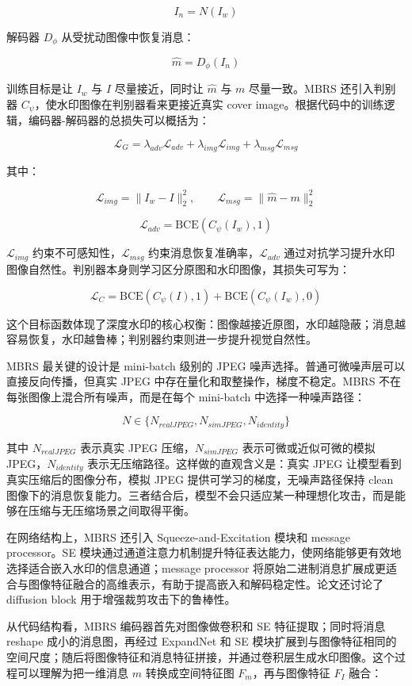﻿\documentclass[UTF8,zihao=5]{ctexart}
\begin{document}
\[
I_n = N(I_w)
\]

解码器 \(D_{\phi}\) 从受扰动图像中恢复消息：

\[
\hat{m} = D_{\phi}(I_n)
\]

训练目标是让 \(I_w\) 与 \(I\) 尽量接近，同时让 \(\hat{m}\) 与 \(m\) 尽量一致。MBRS 还引入判别器 \(C_{\psi}\)，使水印图像在判别器看来更接近真实 cover image。根据代码中的训练逻辑，编码器-解码器的总损失可以概括为：

\[
\mathcal{L}_{G}
= \lambda_{adv}\mathcal{L}_{adv}
+ \lambda_{img}\mathcal{L}_{img}
+ \lambda_{msg}\mathcal{L}_{msg}
\]

其中：

\[
\mathcal{L}_{img}=\|I_w-I\|_2^2,\qquad
\mathcal{L}_{msg}=\|\hat{m}-m\|_2^2
\]

\[
\mathcal{L}_{adv}=\mathrm{BCE}(C_{\psi}(I_w),1)
\]

\(\mathcal{L}_{img}\) 约束不可感知性，\(\mathcal{L}_{msg}\) 约束消息恢复准确率，\(\mathcal{L}_{adv}\) 通过对抗学习提升水印图像自然性。判别器本身则学习区分原图和水印图像，其损失可写为：

\[
\mathcal{L}_{C}
=\mathrm{BCE}(C_{\psi}(I),1)
+\mathrm{BCE}(C_{\psi}(I_w),0)
\]

这个目标函数体现了深度水印的核心权衡：图像越接近原图，水印越隐蔽；消息越容易恢复，水印越鲁棒；判别器约束则进一步提升视觉自然性。

MBRS 最关键的设计是 mini-batch 级别的 JPEG 噪声选择。普通可微噪声层可以直接反向传播，但真实 JPEG 中存在量化和取整操作，梯度不稳定。MBRS 不在每张图像上混合所有噪声，而是在每个 mini-batch 中选择一种噪声路径：

\[
N \in \{N_{realJPEG}, N_{simJPEG}, N_{identity}\}
\]

其中 \(N_{realJPEG}\) 表示真实 JPEG 压缩，\(N_{simJPEG}\) 表示可微或近似可微的模拟 JPEG，\(N_{identity}\) 表示无压缩路径。这样做的直观含义是：真实 JPEG 让模型看到真实压缩后的图像分布，模拟 JPEG 提供可学习的梯度，无噪声路径保持 clean 图像下的消息恢复能力。三者结合后，模型不会只适应某一种理想化攻击，而是能够在压缩与无压缩场景之间取得平衡。

在网络结构上，MBRS 还引入 Squeeze-and-Excitation 模块和 message processor。SE 模块通过通道注意力机制提升特征表达能力，使网络能够更有效地选择适合嵌入水印的信息通道；message processor 将原始二进制消息扩展成更适合与图像特征融合的高维表示，有助于提高嵌入和解码稳定性。论文还讨论了 diffusion block 用于增强裁剪攻击下的鲁棒性。

从代码结构看，MBRS 编码器首先对图像做卷积和 SE 特征提取；同时将消息 reshape 成小的消息图，再经过 ExpandNet 和 SE 模块扩展到与图像特征相同的空间尺度；随后将图像特征和消息特征拼接，并通过卷积层生成水印图像。这个过程可以理解为把一维消息 \(m\) 转换成空间特征图 \(F_m\)，再与图像特征 \(F_I\) 融合：
\end{document}
